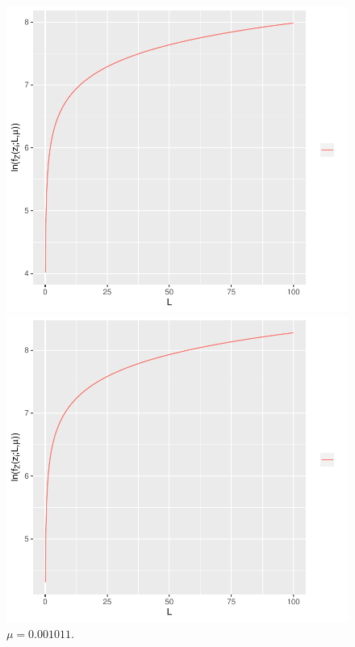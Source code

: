 \documentclass[journal,article,submit,moreauthors,pdftex]{Definitions/mdpi}
\begin{document}
\begin{figure}[hbt]
\endminipage\hfill
\centering
\vspace{0.5cm}
  \includegraphics[width=\linewidth]{func_max_ver_sigma_71_flev_wishart.pdf}
  	\caption{$\mu=0.001358 $.}\label{func_max_ver_l_z_fixo_mu_71_fixo}
\endminipage\hfill
{}
  \includegraphics[width=\linewidth]{func_max_ver_sigma_81_flev_wishart.pdf}
		\caption{$\mu=0.001011 $.}\label{func_max_ver_l_z_fixo_mu_81_fixo}
\endminipage\hfill
\end{figure}
\end{document}

